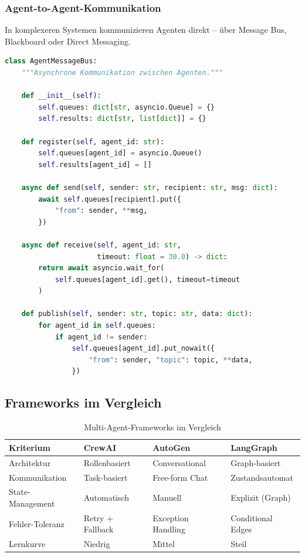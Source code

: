 \subsubsection{Agent-to-Agent-Kommunikation}

In komplexeren Systemen kommunizieren Agenten direkt -- über Message Bus, Blackboard oder Direct Messaging.

\begin{lstlisting}[language=Python, caption=Message-Bus-fuer-Agenten]
class AgentMessageBus:
    """Asynchrone Kommunikation zwischen Agenten."""

    def __init__(self):
        self.queues: dict[str, asyncio.Queue] = {}
        self.results: dict[str, list[dict]] = {}

    def register(self, agent_id: str):
        self.queues[agent_id] = asyncio.Queue()
        self.results[agent_id] = []

    async def send(self, sender: str, recipient: str, msg: dict):
        await self.queues[recipient].put({
            "from": sender, **msg,
        })

    async def receive(self, agent_id: str,
                      timeout: float = 30.0) -> dict:
        return await asyncio.wait_for(
            self.queues[agent_id].get(), timeout=timeout
        )

    def publish(self, sender: str, topic: str, data: dict):
        for agent_id in self.queues:
            if agent_id != sender:
                self.queues[agent_id].put_nowait({
                    "from": sender, "topic": topic, **data,
                })
\end{lstlisting}

\subsection{Frameworks im Vergleich}

\begin{table}[H]
\centering
\begin{tabularx}{\linewidth}{lXXX}
\toprule
\textbf{Kriterium} & \textbf{CrewAI} & \textbf{AutoGen} & \textbf{LangGraph} \\
\midrule
Architektur & Rollenbasiert & Conversational & Graph-basiert \\
Kommunikation & Task-basiert & Free-form Chat & Zustandsautomat \\
State-Management & Automatisch & Manuell & Explizit (Graph) \\
Fehler-Toleranz & Retry + Fallback & Exception Handling & Conditional Edges \\
Lernkurve & Niedrig & Mittel & Steil \\
\bottomrule
\end{tabularx}
\caption{Multi-Agent-Frameworks im Vergleich}
\label{tab:multi-agent-frameworks}
\end{table}

